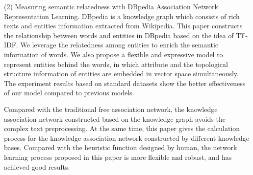 \begin{englishabstract}
    (2) Measuring semantic relatedness with DBpedia Association Network Representation Learning. DBpedia is a knowledge graph which consists of rich texts and entities information extracted from Wikipedia. This paper constructs the relationship between words and entities in DBpedia based on the idea of TF-IDF. We leverage the relatedness among entities to enrich the semantic information of words. We also propose a flexible and expressive model to represent entities behind the words, in which attribute and the topological structure information of entities are embedded in vector space simultaneously. The experiment results based on standard datasets show the better effectiveness of our model compared to previous models.

    Compared with the traditional free association network, the knowledge association network constructed based on the knowledge graph avoids the complex text preprocessing. At the same time, this paper gives the calculation process for the knowledge association network constructed by different knowledge bases. Compared with the heuristic function designed by human, the network learning process proposed in this paper is more flexible and robust, and has achieved good results.


\end{englishabstract}



